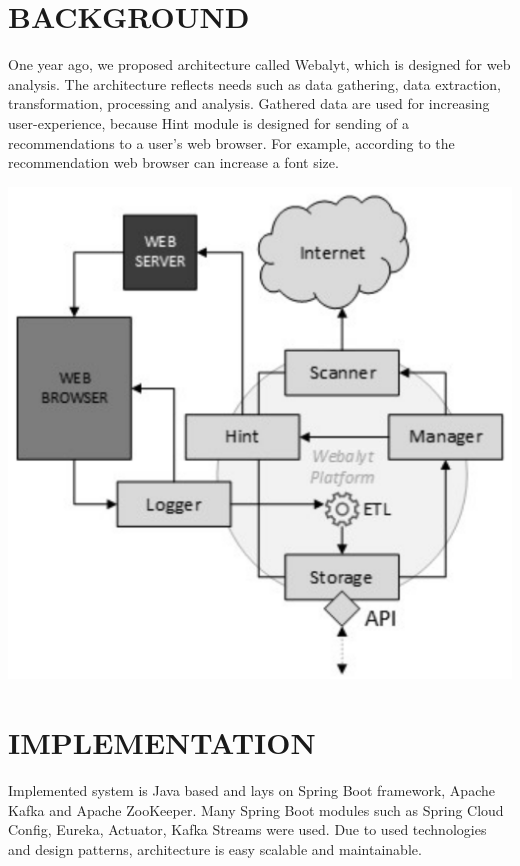 \documentclass[landscape]{a0poster}
\begin{document}
\begin{multicols}{3}
\section*{BACKGROUND}
\color{black}
One year ago, we proposed architecture called Webalyt, which is designed for web analysis. The architecture reflects needs such as data gathering, data extraction, transformation, processing and analysis. Gathered data are used for increasing user-experience, because  Hint module is designed for sending of a recommendations to a user's web browser. For example, according to the recommendation web browser can increase a font size.
\begin{center}\vspace{1cm}
\includegraphics[width=0.60\columnwidth]{webalyt-architecture.png}
\color{MainColor}
\end{center}\vspace{1cm}


\vfill\null
\columnbreak 
 

\color{MainColor} 
\section*{IMPLEMENTATION}
\color{black}

Implemented system is Java based and lays on Spring Boot framework, Apache Kafka and Apache ZooKeeper. Many Spring Boot modules such as Spring Cloud Config, Eureka, Actuator, Kafka Streams were used. Due to used technologies and design patterns, architecture is easy scalable and maintainable.




\end{multicols}
\end{document}
